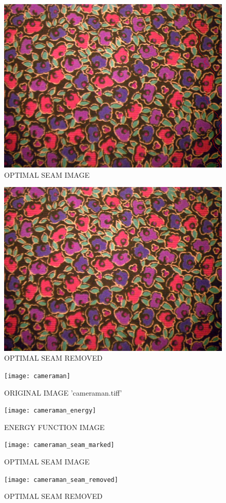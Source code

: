 \documentclass[12pt]{article}
\begin{document}
\begin{figure}
	\centering
	\includegraphics[width=0.7\linewidth]{fabric_seam_marked}
	\caption{OPTIMAL SEAM IMAGE}
	\label{fig:fabricseammarked}
\end{figure}

\begin{figure}
	\centering
	\includegraphics[width=0.7\linewidth]{fabric_seam_removed}
	\caption{OPTIMAL SEAM REMOVED}
	\label{fig:fabricseamremoved}
\end{figure}


\begin{figure}
	\centering
	\texttt{[image: cameraman]}
	\caption{ORIGINAL IMAGE 'cameraman.tiff'}
	\label{fig:cameraman}
\end{figure}
\begin{figure}
	\centering
	\texttt{[image: cameraman\_energy]}
	\caption{ENERGY FUNCTION IMAGE}
	\label{fig:cameramanenergy}
\end{figure}
\begin{figure}
	\centering
	\texttt{[image: cameraman\_seam\_marked]}
	\caption{OPTIMAL SEAM IMAGE}
	\label{fig:cameramanseammarked}
\end{figure}
\begin{figure}
	\centering
	\texttt{[image: cameraman\_seam\_removed]}
	\caption{OPTIMAL SEAM REMOVED}
	\label{fig:cameramanseamremoved}
\end{figure}
\end{document}
